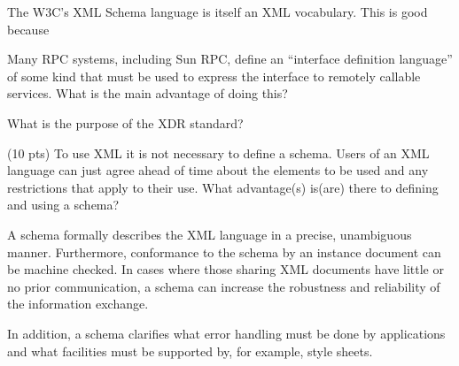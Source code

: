 \documentclass[12pt]{examdesign}
\begin{document}
\begin{multiplechoice}
  \begin{question}
    The W3C's XML Schema language is itself an XML vocabulary. This is good because

  \end{question}

  \begin{question}
    Many RPC systems, including Sun RPC, define an ``interface definition language'' of some
    kind that must be used to express the interface to remotely callable services. What is the
    main advantage of doing this?

  \end{question}
  
  \begin{question}
    What is the purpose of the XDR standard?

  \end{question}
  
\end{multiplechoice}
\pagebreak

\begin{shortanswer}
  \begin{question}
    (10 pts) To use XML it is not necessary to define a schema. Users of an XML language can
    just agree ahead of time about the elements to be used and any restrictions that apply to
    their use. What advantage(s) is(are) there to defining and using a schema?

    \begin{answer}
      A schema formally describes the XML language in a precise, unambiguous manner.
      Furthermore, conformance to the schema by an instance document can be machine checked. In
      cases where those sharing XML documents have little or no prior communication, a schema
      can increase the robustness and reliability of the information exchange.

      In addition, a schema clarifies what error handling must be done by applications and what
      facilities must be supported by, for example, style sheets.
    \end{answer}
  \end{question}
\end{shortanswer}
\end{document}
